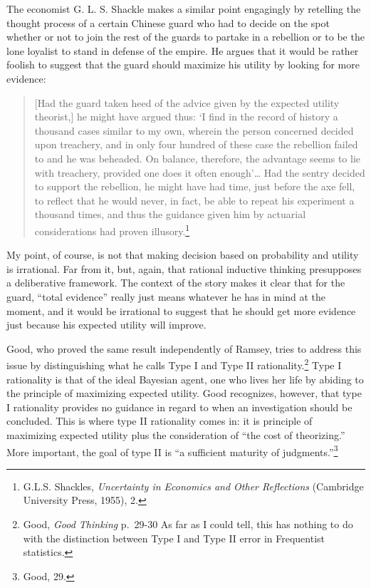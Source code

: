 The economist G. L. S. Shackle makes a similar point engagingly by
retelling the thought process of a certain Chinese guard who had to
decide on the spot whether or not to join the rest of the guards to
partake in a rebellion or to be the lone loyalist to stand in defense of
the empire. He argues that it would be rather foolish to suggest that
the guard should maximize his utility by looking for more evidence:

\begin{quote}
{[}Had the guard taken heed of the advice given by the expected utility
theorist,{]} he might have argued thus: `I find in the record of history
a thousand cases similar to my own, wherein the person concerned decided
upon treachery, and in only four hundred of these case the rebellion
failed to and he was beheaded. On balance, therefore, the advantage
seems to lie with treachery, provided one does it often enough'\ldots{}
Had the sentry decided to support the rebellion, he might have had time,
just before the axe fell, to reflect that he would never, in fact, be
able to repeat his experiment a thousand times, and thus the guidance
given him by actuarial considerations had proven illusory.\footnote{G.L.S.
  Shackles, \emph{Uncertainty in Economics and Other Reflections}
  (Cambridge University Press, 1955), 2.}
\end{quote}

My point, of course, is not that making decision based on probability
and utility is irrational. Far from it, but, again, that rational
inductive thinking presupposes a deliberative framework. The context of
the story makes it clear that for the guard, ``total evidence'' really
just means whatever he has in mind at the moment, and it would be
irrational to suggest that he should get more evidence just because his
expected utility will improve.

Good, who proved the same result independently of Ramsey, tries to
address this issue by distinguishing what he calls Type I and Type II
rationality.\footnote{Good, \emph{Good Thinking} p.~29-30 As far as I
  could tell, this has nothing to do with the distinction between Type I
  and Type II error in Frequentist statistics.} Type I rationality is
that of the ideal Bayesian agent, one who lives her life by abiding to
the principle of maximizing expected utility. Good recognizes, however,
that type I rationality provides no guidance in regard to when an
investigation should be concluded. This is where type II rationality
comes in: it is principle of maximizing expected utility plus the
consideration of ``the cost of theorizing.'' More important, the goal of
type II is ``a sufficient maturity of judgments.''\footnote{Good, 29.}

